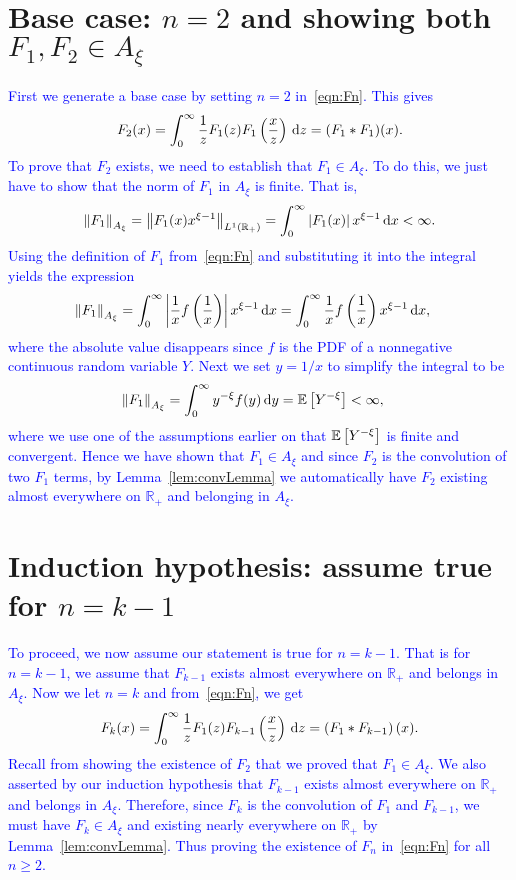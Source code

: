 \section{Base case: $n = 2$ and showing both $F_1, F_2 \in A_\xi$}
\textcolor{blue}{
First we generate a base case by setting $n=2$ in~\eqref{eqn:Fn}. This gives
	\begin{equation*}
		F_2(x) = \int_0^\infty \frac{1}{z} F_1(z)F_1\left( \frac{x}{z}\right) \, \mathrm d z = (F_1 \ast F_1)(x).
	\end{equation*}
To prove that $F_2$ exists, we need to establish that $F_1 \in A_\xi$. To do this, we just have to show that the norm of $F_1$ in $A_\xi$ is finite. That is,
	$$
		\left\lVert F_1 \right\rVert_{A_\xi} = \left\lVert F_1(x)x^{\xi-1}\right\rVert_{L^1(\mathbb{R}_{+})} = \int_0^\infty \left| F_1(x) \right|x^{\xi-1} \, \mathrm d x < \infty.
	$$
Using the definition of $F_1$ from~\eqref{eqn:Fn} and substituting it into the integral yields the expression
	\begin{align*}
		\left\lVert F_1\right\rVert_{A_\xi} &= \int_0^\infty \left| \frac{1}{x}f\left( \frac{1}{x}\right) \right|x^{\xi-1} \, \mathrm d x =  \int_0^\infty \frac{1}{x}f\left(\frac{1}{x}\right)x^{\xi-1} \, \mathrm d x,
	\end{align*}
where the absolute value disappears since $f$ is the PDF of a nonnegative continuous random variable $Y$. Next we set $y = 1/x$ to simplify the integral to be
	\begin{align*}
		\left\lVert F_1\right\rVert_{A_\xi} &= \int_0^\infty y^{-\xi}f(y) \, \mathrm d y = \mathbb E\left[ Y^{-\xi}\right] < \infty,
	\end{align*}
where we use one of the assumptions earlier on that $\mathbb E\left[ Y^{-\xi} \right]$ is finite and convergent. Hence we have shown that $F_1 \in A_\xi$ and since $F_2$ is the convolution of two $F_1$ terms, by Lemma~\ref{lem:convLemma} we automatically have $F_2$ existing almost everywhere on $\mathbb{R_{+}}$ and belonging in $A_\xi$.
}
\section{Induction hypothesis: assume true for $n = k-1$}
\textcolor{blue}{
To proceed, we now assume our statement is true for $n=k-1$. That is for $n=k-1$, we assume that $F_{k-1}$ exists almost everywhere on $\mathbb{R_{+}}$ and belongs in $A_\xi$. Now we let $n=k$ and from~\eqref{eqn:Fn}, we get
	$$
		F_k(x) = \int_0^\infty \frac{1}{z}F_1(z)F_{k-1}\left(\frac{x}{z}\right) \, \mathrm d z = \left( F_1 \ast F_{k-1} \right)(x).
	$$
Recall from showing the existence of $F_2$ that we proved that $F_1 \in A_\xi$. We also asserted by our induction hypothesis that $F_{k-1}$ exists almost everywhere on $\mathbb{R_{+}}$ and belongs in $A_\xi$. Therefore, since $F_k$ is the convolution of $F_1$ and $F_{k-1}$, we must have $F_k \in A_\xi$ and existing nearly everywhere on $\mathbb{R_{+}}$ by Lemma~\ref{lem:convLemma}. Thus proving the existence of $F_n$ in~\eqref{eqn:Fn} for all $n \geq 2$.}